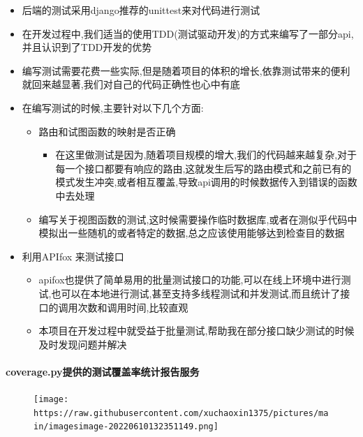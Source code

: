 \documentclass[
]{article}
\begin{document}
\begin{itemize}
\item
  后端的测试采用django推荐的unittest来对代码进行测试
\item
  在开发过程中,我们适当的使用TDD(测试驱动开发)的方式来编写了一部分api,并且认识到了TDD开发的优势
\item
  编写测试需要花费一些实际,但是随着项目的体积的增长,依靠测试带来的便利就回来越显著,我们对自己的代码正确性也心中有底
\item
  在编写测试的时候,主要针对以下几个方面:

  \begin{itemize}
  \item
    路由和试图函数的映射是否正确

    \begin{itemize}
    \item
      在这里做测试是因为,随着项目规模的增大,我们的代码越来越复杂,对于每一个接口都要有响应的路由,这就发生后写的路由模式和之前已有的模式发生冲突,或者相互覆盖,导致api调用的时候数据传入到错误的函数中去处理
    \end{itemize}
  \item
    编写关于视图函数的测试,这时候需要操作临时数据库,或者在测似乎代码中模拟出一些随机的或者特定的数据,总之应该使用能够达到检查目的数据
  \end{itemize}
\item
  利用APIfox 来测试接口

  \begin{itemize}
  \item
    apifox也提供了简单易用的批量测试接口的功能,可以在线上环境中进行测试,也可以在本地进行测试,甚至支持多线程测试和并发测试,而且统计了接口的调用次数和调用时间,比较直观
  \item
    本项目在开发过程中就受益于批量测试,帮助我在部分接口缺少测试的时候及时发现问题并解决
  \end{itemize}
\end{itemize}

\hypertarget{coveragepyux63d0ux4f9bux7684ux6d4bux8bd5ux8986ux76d6ux7387ux7edfux8ba1ux62a5ux544aux670dux52a1}{%
\paragraph{coverage.py提供的测试覆盖率统计报告服务}\label{coveragepyux63d0ux4f9bux7684ux6d4bux8bd5ux8986ux76d6ux7387ux7edfux8ba1ux62a5ux544aux670dux52a1}}

\begin{figure}
\centering
\texttt{[image: https://raw.githubusercontent.com/xuchaoxin1375/pictures/main/imagesimage-20220610132351149.png]}
\caption{}
\end{figure}
\end{document}
